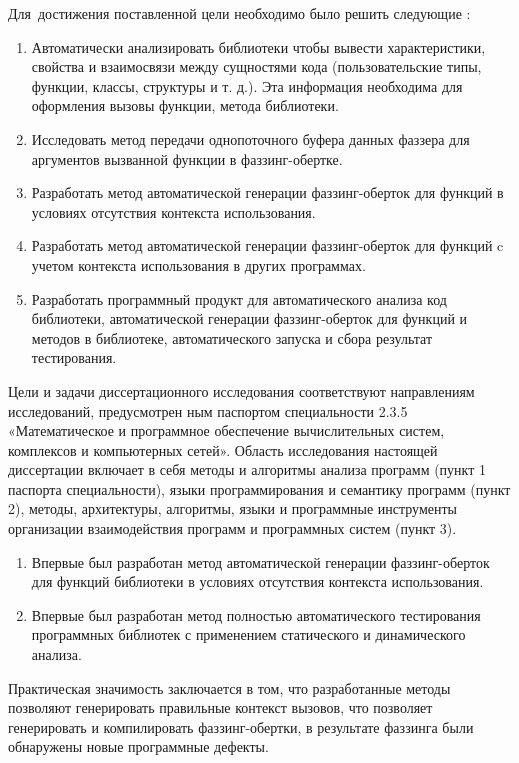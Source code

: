 Для~достижения поставленной цели необходимо было решить следующие {\tasks}:
\begin{enumerate}[beginpenalty=10000] %
  \item Автоматически анализировать библиотеки чтобы вывести характеристики, свойства и взаимосвязи между сущностями кода (пользовательские типы, функции, классы, структуры и т. д.). Эта информация необходима для оформления вызовы функции, метода библиотеки.
  \item Исследовать метод передачи однопоточного буфера данных фаззера для аргументов вызванной функции в фаззинг-обертке.
  \item Разработать метод автоматической генерации фаззинг-оберток для функций в условиях отсутствия контекста использования.
  \item Разработать метод автоматической генерации фаззинг-оберток для функций c учетом контекста использования в других программах.
  \item Разработать программный продукт для автоматического анализа код библиотеки, автоматической генерации фаззинг-оберток для функций и методов в библиотеке, автоматического запуска и сбора результат тестирования.
\end{enumerate}

{\compliance} Цели и задачи диссертационного исследования соответствуют направлениям исследований, предусмотрен­ ным паспортом специальности 2.3.5 «Математическое и программное обеспечение вычислительных систем, комплексов и компьютерных сетей». Область исследования настоящей диссертации включает в себя методы и алгоритмы анализа программ (пункт 1 паспорта специальности), языки программирования  и семантику программ (пункт 2), методы, архитектуры, алгоритмы, языки и программные инструменты организации взаимодействия программ и программных систем (пункт 3).

{\novelty}
\begin{enumerate}[beginpenalty=10000] %
  \item Впервые был разработан метод автоматической генерации фаззинг-оберток для функций библиотеки в условиях отсутствия контекста использования.
  \item Впервые был разработан метод полностью автоматического тестирования программных библиотек с применением статического и динамического анализа.
\end{enumerate}

{\influence} Практическая значимость заключается в том, что разработанные методы позволяют  генерировать правильные контекст вызовов, что позволяет генерировать  и компилировать фаззинг-обертки, в результате фаззинга были  обнаружены новые программные дефекты.

